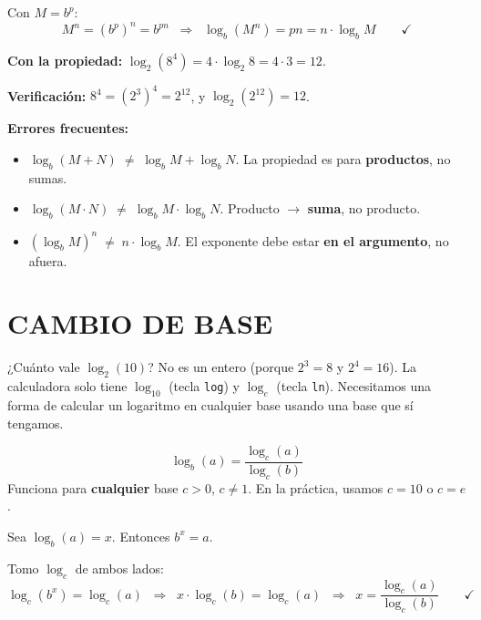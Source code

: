 \documentclass[11pt,a4paper]{article}
\begin{document}
\begin{tcolorbox}[definicion, title={¿De dónde sale?}]
Con $M = b^{p}$:
\[
  M^{n} = (b^{p})^{n} = b^{pn} \;\;\Longrightarrow\;\; \log_b(M^{n}) = pn = n \cdot \log_b M \qquad \checkmark
\]
\end{tcolorbox}

\begin{tcolorbox}[ejemplo, title={Ejemplo: $\log_2(8^{4})$}]
\textbf{Con la propiedad:} $\log_2(8^{4}) = 4 \cdot \log_2 8 = 4 \cdot 3 = 12$.

\textbf{Verificación:} $8^{4} = (2^{3})^{4} = 2^{12}$, y $\log_2(2^{12}) = 12$. \checkmark
\end{tcolorbox}

\begin{tcolorbox}[recuerda]
\textbf{Errores frecuentes:}
\begin{itemize}[nosep]
  \item $\log_b(M + N) \;\ne\; \log_b M + \log_b N$. \quad La propiedad es para \textbf{productos}, no sumas.
  \item $\log_b(M \cdot N) \;\ne\; \log_b M \cdot \log_b N$. \quad Producto $\to$ \textbf{suma}, no producto.
  \item $(\log_b M)^{n} \;\ne\; n \cdot \log_b M$. \quad El exponente debe estar \textbf{en el argumento}, no afuera.
\end{itemize}
\end{tcolorbox}

\newpage

\section{CAMBIO DE BASE}

¿Cuánto vale $\log_2(10)$? No es un entero (porque $2^3 = 8$ y $2^4 = 16$). La calculadora solo tiene $\log_{10}$ (tecla \texttt{log}) y $\log_e$ (tecla \texttt{ln}). Necesitamos una forma de calcular un logaritmo en cualquier base usando una base que sí tengamos.

\begin{tcolorbox}[propiedad, title={Fórmula de cambio de base}]
\[
  \boxed{\;\log_b(a) = \frac{\log_c(a)}{\log_c(b)}\;}
\]
Funciona para \textbf{cualquier} base $c > 0$, $c \ne 1$. En la práctica, usamos $c = 10$ o $c = e$.
\end{tcolorbox}

\begin{tcolorbox}[definicion, title={¿De dónde sale?}]
Sea $\log_b(a) = x$. Entonces $b^{x} = a$.

Tomo $\log_c$ de ambos lados:
\[
  \log_c(b^{x}) = \log_c(a) \;\;\Longrightarrow\;\; x \cdot \log_c(b) = \log_c(a) \;\;\Longrightarrow\;\; x = \frac{\log_c(a)}{\log_c(b)} \qquad \checkmark
\]
\end{tcolorbox}
\end{document}
